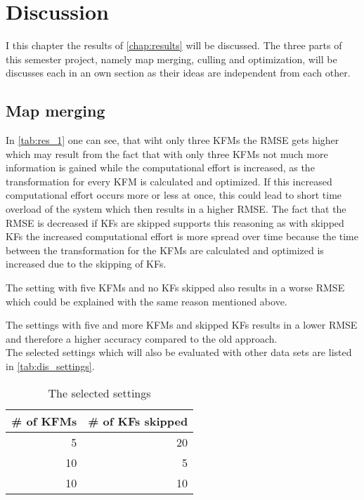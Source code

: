 \chapter{Discussion}
I this chapter the results of \autoref{chap:results} will be discussed. The three parts of this semester project, namely map merging, culling and optimization, will be discusses each in an own section as their ideas are independent from each other.

\section{Map merging}
In \autoref{tab:res_1} one can see, that wiht only three \acp{KFM} the \ac{RMSE} gets higher which may result from the fact that with only three \acp{KFM} not much more information is gained while the computational effort is increased, as the transformation for every \ac{KFM} is calculated and optimized. If this increased computational effort occurs more or less at once, this could lead to short time overload of the system which then results in a higher \ac{RMSE}. The fact that the \ac{RMSE} is decreased if \acp{KF} are skipped supports this reasoning as with skipped \acp{KF} the increased computational effort is more spread over time because the time between the transformation for the \acp{KFM} are calculated and optimized is increased due to the skipping of \acp{KF}.

The setting with five \acp{KFM} and no \acp{KF} skipped also results in a worse \ac{RMSE} which could be explained with the same reason mentioned above.

The settings with five and more \acp{KFM} and skipped \acp{KF} results in a lower \ac{RMSE} and therefore a higher accuracy compared to the old approach.\\

The selected settings which will also be evaluated with other data sets are listed in \autoref{tab:dis_settings}.

\begin{table}[ht!]
  \begin{center}
  \begin{tabular}{r|r}
    \# of \acp{KFM} & \# of \acp{KF} skipped  \\ 
    \hline 
    5 & 20 \\ 
    10 & 5 \\ 
    10 & 10 \\ 
  \end{tabular} 
  \end{center}
  \caption{The selected settings}
  \label{tab:dis_settings}
\end{table}

